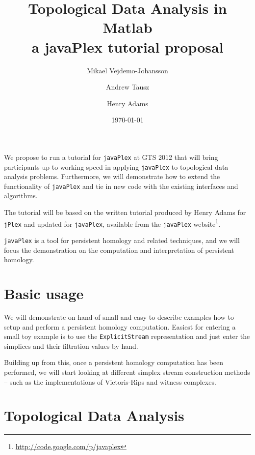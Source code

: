 \documentclass{amsart}
\newcommand\jPlex{\texttt{jPlex}\xspace}
\newcommand\javaPlex{\texttt{javaPlex}\xspace}
\begin{document}
\title{Topological Data Analysis in Matlab \\ a javaPlex tutorial proposal}

\author{Mikael Vejdemo-Johansson}
\address{School of Computer Science; University of St Andrews; Scotland}

\author{Andrew Tausz}
\address{Stanford University, Stanford, CA, 94305}

\author{Henry Adams}
\address{Stanford University, Stanford, CA, 94305}


\date{\today}
\maketitle


We propose to run a tutorial for \javaPlex at GTS 2012 that will bring participants up to working speed in applying \javaPlex to topological data analysis problems. Furthermore, we will demonstrate how to extend the functionality of \javaPlex and tie in new code with the existing interfaces and algorithms.

The tutorial will be based on the written tutorial produced by Henry Adams for \jPlex and updated for \javaPlex, available from the \javaPlex website\footnote{\url{http://code.google.com/p/javaplex}}.

\javaPlex is a tool for persistent homology and related techniques, and we will focus the demonstration on the computation and interpretation of persistent homology.

\section{Basic usage}
\label{sec:basic-usage}

We will demonstrate on hand of small and easy to describe examples how to setup and perform a persistent homology computation. Easiest for entering a small toy example is to use the \texttt{ExplicitStream} representation and just enter the simplices and their filtration values by hand. 

Building up from this, once a persistent homology computation has been performed, we will start looking at different simplex stream construction methods -- such as the implementations of Vietoris-Rips and witness complexes. 

\section{Topological Data Analysis}
\label{sec:topol-data-analys}
\end{document}
